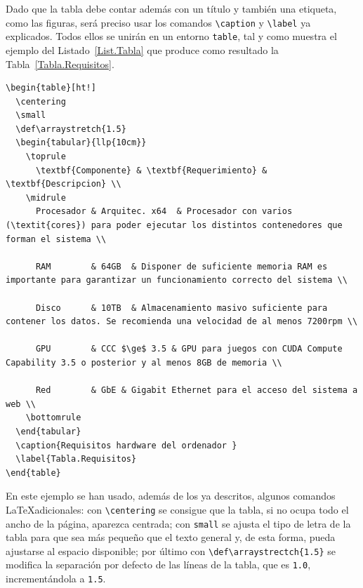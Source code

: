 Dado que la tabla debe contar además con un título y también una etiqueta, como las figuras, será preciso usar los comandos \verb|\caption| y \verb|\label| ya explicados. Todos ellos se unirán en un entorno \verb|table|, tal y como muestra el ejemplo del Listado~\ref{List.Tabla} que produce como resultado la Tabla~\ref{Tabla.Requisitos}.

\begin{lstlisting}[language={[LaTeX]TeX},caption={Creación de una tabla},label={List.Tabla}]
\begin{table}[ht!]
  \centering
  \small
  \def\arraystretch{1.5}
  \begin{tabular}{llp{10cm}}
    \toprule
      \textbf{Componente} & \textbf{Requerimiento} & \textbf{Descripcion} \\
    \midrule
      Procesador & Arquitec. x64  & Procesador con varios (\textit{cores}) para poder ejecutar los distintos contenedores que forman el sistema \\
      
      RAM        & 64GB  & Disponer de suficiente memoria RAM es importante para garantizar un funcionamiento correcto del sistema \\
      
      Disco      & 10TB  & Almacenamiento masivo suficiente para contener los datos. Se recomienda una velocidad de al menos 7200rpm \\
      
      GPU        & CCC $\ge$ 3.5 & GPU para juegos con CUDA Compute Capability 3.5 o posterior y al menos 8GB de memoria \\
      
      Red        & GbE & Gigabit Ethernet para el acceso del sistema a web \\
    \bottomrule
  \end{tabular}
  \caption{Requisitos hardware del ordenador }
  \label{Tabla.Requisitos}
\end{table}
\end{lstlisting}

En este ejemplo se han usado, además de los ya descritos, algunos comandos \LaTeX adicionales: con \verb|\centering| se consigue que la tabla, si no ocupa todo el ancho de la página, aparezca centrada; con \verb|small| se ajusta el tipo de letra de la tabla para que sea más pequeño que el texto general y, de esta forma, pueda ajustarse al espacio disponible; por último con \verb|\def\arraystrectch{1.5}| se modifica la separación por defecto de las líneas de la tabla, que es \texttt{1.0}, incrementándola a \texttt{1.5}.

